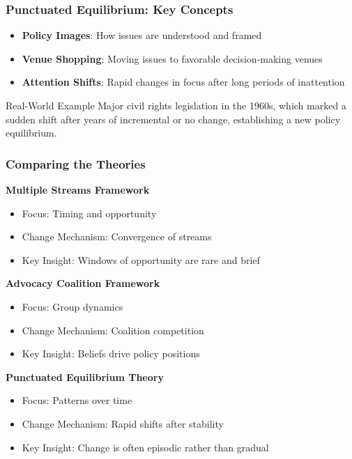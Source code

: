 \documentclass[10pt]{beamer}
\begin{document}
\begin{frame}
\frametitle{Punctuated Equilibrium: Key Concepts}

\begin{itemize}
  \item \textbf{Policy Images}: How issues are understood and framed
  \item \textbf{Venue Shopping}: Moving issues to favorable decision-making venues
  \item \textbf{Attention Shifts}: Rapid changes in focus after long periods of inattention
\end{itemize}

\vspace{0.5cm}

\begin{alertblock}{Real-World Example}
Major civil rights legislation in the 1960s, which marked a sudden shift after years of incremental or no change, establishing a new policy equilibrium.
\end{alertblock}

\end{frame}

\begin{frame}
\frametitle{Comparing the Theories}

\textbf{Multiple Streams Framework}
\begin{itemize}
\item Focus: Timing and opportunity
\item Change Mechanism: Convergence of streams
\item Key Insight: Windows of opportunity are rare and brief
\end{itemize}

\textbf{Advocacy Coalition Framework}
\begin{itemize}
\item Focus: Group dynamics
\item Change Mechanism: Coalition competition
\item Key Insight: Beliefs drive policy positions
\end{itemize}

\textbf{Punctuated Equilibrium Theory}
\begin{itemize}
\item Focus: Patterns over time
\item Change Mechanism: Rapid shifts after stability
\item Key Insight: Change is often episodic rather than gradual
\end{itemize}

\end{frame}
\end{document}
